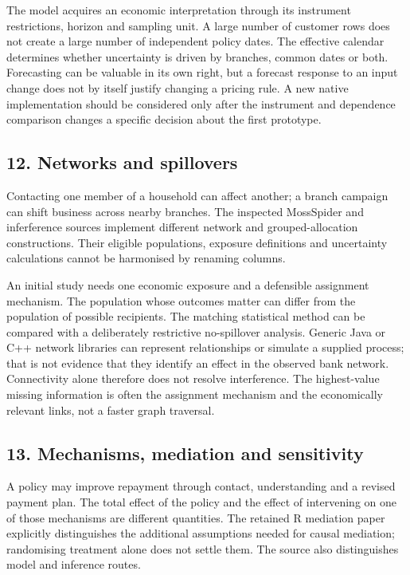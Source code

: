 The model acquires an economic interpretation through its instrument
restrictions, horizon and sampling unit. A large number of customer rows does not create a large number of
independent policy dates. The effective calendar determines whether uncertainty is driven by
branches, common dates or both. Forecasting can be
valuable in its own right, but a forecast response to an input change does not
by itself justify changing a pricing rule. A new native implementation should
be considered only after the instrument and dependence comparison changes a
specific decision about the first prototype.

\subsection{12. Networks and spillovers}
Contacting one member of a household can affect another; a branch campaign can
shift business across nearby branches. The inspected MossSpider and
inferference sources implement different network and grouped-allocation
constructions. Their eligible populations, exposure definitions and uncertainty
calculations cannot be harmonised by renaming columns.
\citep{exec24_interference_mossspider,exec24_interference_inferference}

An initial study needs one economic exposure and a defensible assignment
mechanism. The population whose outcomes matter can differ from the population
of possible recipients. The matching statistical method can be compared
with a deliberately restrictive no-spillover analysis. Generic Java
or C++ network libraries can represent relationships or simulate a supplied
process; that is not evidence that they identify an effect in the observed
bank network. Connectivity alone therefore does not resolve interference.
The highest-value missing information is often the assignment mechanism and
the economically relevant links, not a faster graph traversal.

\subsection{13. Mechanisms, mediation and sensitivity}
A policy may improve repayment through contact, understanding and a revised
payment plan. The total effect of the policy and the effect of intervening on
one of those mechanisms are different quantities. The retained R mediation
paper explicitly distinguishes the additional assumptions needed for causal
mediation; randomising treatment alone does not settle them. The source also
distinguishes model and inference routes.
\citep{exec24_mediation_original,exec24_mediation_sources}

